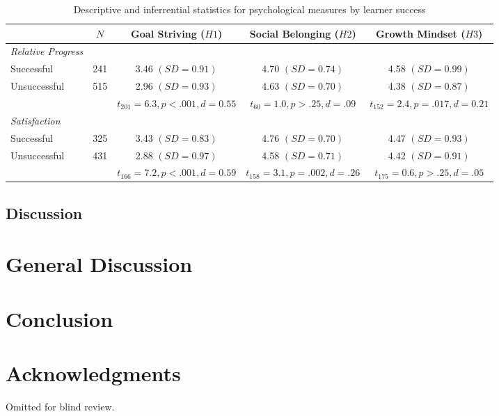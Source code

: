 \documentclass{sigchi}\usepackage[]{graphicx}\usepackage[]{color}
\begin{document}
\begin{table*}[ht]
\caption{Descriptive and inferrential statistics for psychological measures by learner success}
\label{tab:psych}
\small
\center
\begin{tabular}{lcccc}
\toprule
 & $N$ & Goal Striving ($H1$) & Social Belonging ($H2$) & Growth Mindset ($H3$) \\
\midrule
\emph{Relative Progress} &  &  &  \\
\quad Successful & 241 & 3.46 $(SD=0.91)$ & 4.70 $(SD=0.74)$ &  4.58 $(SD=0.99)$ \\
\quad Unsuccessful & 515 & 2.96 $(SD=0.93)$ & 4.63 $(SD=0.70)$ & 4.38 $(SD=0.87)$ \\
 &  & $t_{201}=6.3, p<.001, d=0.55$ & $t_{60}=1.0, p>.25, d=.09$ & $t_{152}=2.4, p=.017, d=0.21$ \\
 \emph{Satisfaction} &  &  &  \\
\quad Successful & 325 & 3.43 $(SD=0.83)$ & 4.76 $(SD=0.70)$ & 4.47 $(SD=0.93)$ \\
\quad Unsuccessful & 431 & 2.88 $(SD=0.97)$ & 4.58 $(SD=0.71)$ & 4.42 $(SD=0.91)$ \\
&  & $t_{166}=7.2, p<.001, d=0.59$ & $t_{158}=3.1, p=.002, d=.26$ & $t_{175}=0.6, p>.25, d=.05$ \\
\bottomrule
\end{tabular}
\end{table*}



\subsection{Discussion}


\section{General Discussion}


\section{Conclusion}


\section{Acknowledgments}
Omitted for blind review.
\end{document}
